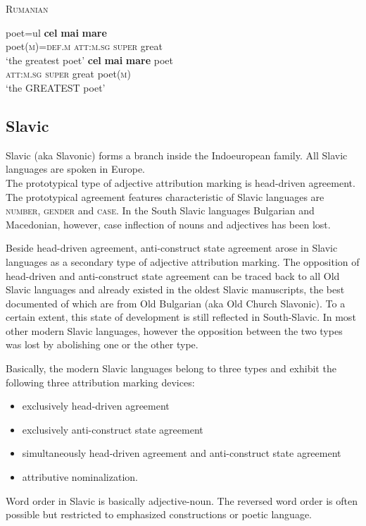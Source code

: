 \begin{exe}
\ex \textsc{Rumanian} \citep[93–94]{beyer-etal1987}
\begin{xlist}
\ex	\label{rum def comp}%
\gll	poet=ul \textbf{cel} \textbf{mai} \textbf{mare}\\
	poet(\textsc{m})=\textsc{def.m} \textsc{att:m.sg} \textsc{super} great\\
\glt	‘the greatest poet’
\ex	\label{rum def sup}
\gll	\textbf{cel} \textbf{mai} \textbf{mare} poet\\
	\textsc{att:m.sg} \textsc{super} great poet(\textsc{m})\\
\glt	‘the GREATEST poet’
\end{xlist}
\end{exe}

\subsection{Slavic} \label{slavic synchr}
Slavic (aka Slavonic) forms a branch inside the Indoeuropean family. All Slavic languages are spoken in Europe.\\

\noindent The prototypical type of adjective attribution marking is head-driven agreement. The prototypical agreement features characteristic of Slavic languages are \textsc{number}, \textsc{gender} and \textsc{case}. In the South Slavic languages Bulgarian and Macedonian, however, case inflection of nouns and adjectives has been lost.

Beside head-driven agreement, anti-construct state agreement arose in Slavic languages as a secondary type of adjective attribution marking. The opposition of head-driven and anti-construct state agreement can be traced back to all Old Slavic languages and already existed in the oldest Slavic manuscripts, the best documented of which are from Old Bulgarian (aka Old Church Slavonic). To a certain extent, this state of development is still reflected in South-Slavic. In most other modern Slavic languages, however the opposition between the two types was lost by abolishing one or the other type.

Basically, the modern Slavic languages belong to three types and exhibit the following three attribution marking devices:
\begin{itemize}
\item{exclusively head-driven agreement}
\item{exclusively anti-construct state agreement}
\item{simultaneously head-driven agreement and anti-construct state agreement}
\item{attributive nominalization.}
\end{itemize}
Word order in Slavic is basically adjective-noun. The reversed word order is often possible but restricted to emphasized constructions or poetic language. 

